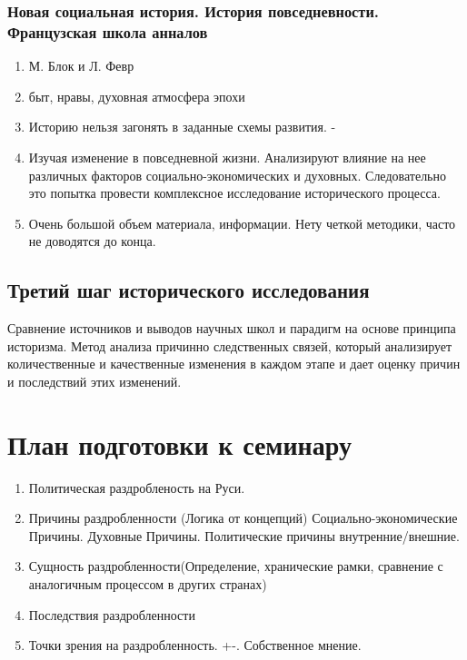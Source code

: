 \documentclass[a4paper]{article}
\begin{document}
\subsubsection{Новая социальная история. История повседневности. Французская школа анналов}
\begin{enumerate}
    \item М. Блок и Л. Февр
    \item быт, нравы, духовная атмосфера эпохи
    \item Историю нельзя загонять в заданные схемы развития. -
    \item Изучая изменение в повседневной жизни. Анализируют влияние на нее различных факторов социально-экономических и духовных. Следовательно это попытка провести комплексное исследование исторического процесса.
    \item Очень большой объем материала, информации. Нету четкой методики, часто не доводятся до конца.
\end{enumerate}

\subsection{Третий шаг исторического исследования}
Сравнение источников и выводов научных школ и парадигм на основе принципа историзма. Метод анализа причинно следственных связей, который анализирует количественные и качественные изменения в каждом этапе и дает оценку причин и последствий этих изменений.

\section{План подготовки к семинару}
\begin{enumerate}
\item Политическая раздробленость на Руси.
\item Причины раздробленности (Логика от концепций)
    Социально-экономические Причины.
    Духовные Причины.
    Политические причины внутренние/внешние.
\item Сущность раздробленности(Определение, хранические рамки, сравнение с аналогичным процессом в других странах)
\item Последствия раздробленности
\item Точки зрения на раздробленность. +-. Собственное мнение.
\end{enumerate}
\end{document}

